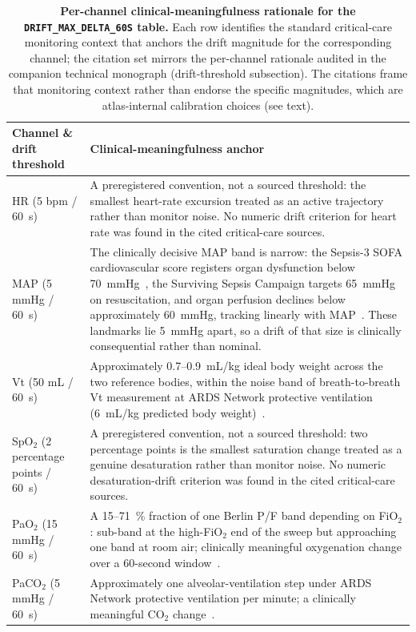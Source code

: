 \documentclass[pdflatex,sn-nature]{sn-jnl}%
\begin{document}
\begin{table}[htbp]
\centering
\small
\caption{\textbf{Per-channel clinical-meaningfulness rationale for the \texttt{DRIFT\_MAX\_DELTA\_60S} table.} Each row identifies the standard critical-care monitoring context that anchors the drift magnitude for the corresponding channel; the citation set mirrors the per-channel rationale audited in the companion technical monograph (drift-threshold subsection). The citations frame that monitoring context rather than endorse the specific magnitudes, which are atlas-internal calibration choices (see text).}
\label{tab:drift-rationale}
\begin{tabular}{lp{}}
\toprule
Channel \& drift threshold & Clinical-meaningfulness anchor \\
\midrule
HR (5 bpm / 60~s) &
A preregistered convention, not a sourced threshold: the smallest heart-rate excursion treated as an active trajectory rather than monitor noise. No numeric drift criterion for heart rate was found in the cited critical-care sources. \\
MAP (5 mmHg / 60~s) &
The clinically decisive MAP band is narrow: the Sepsis-3 SOFA cardiovascular score registers organ dysfunction below 70~mmHg~\cite{singer2016}, the Surviving Sepsis Campaign targets 65~mmHg on resuscitation, and organ perfusion declines below approximately 60~mmHg, tracking linearly with MAP~\cite{evans2021sepsis}. These landmarks lie 5~mmHg apart, so a drift of that size is clinically consequential rather than nominal. \\
Vt (50 mL / 60~s) &
Approximately 0.7--0.9~mL/kg ideal body weight across the two reference bodies, within the noise band of breath-to-breath Vt measurement at ARDS Network protective ventilation (6~mL/kg predicted body weight)~\cite{brower2000}. \\
SpO$_2$ (2 percentage points / 60~s) &
A preregistered convention, not a sourced threshold: two percentage points is the smallest saturation change treated as a genuine desaturation rather than monitor noise. No numeric desaturation-drift criterion was found in the cited critical-care sources. \\
PaO$_2$ (15 mmHg / 60~s) &
A 15--71~\% fraction of one Berlin P/F band depending on FiO$_2$: sub-band at the high-FiO$_2$ end of the sweep but approaching one band at room air; clinically meaningful oxygenation change over a 60-second window~\cite{ards2012}. \\
PaCO$_2$ (5 mmHg / 60~s) &
Approximately one alveolar-ventilation step under ARDS Network protective ventilation per minute; a clinically meaningful CO$_2$ change~\cite{west2020respiratory}. \\
\bottomrule
\end{tabular}
\end{table}
\end{document}
